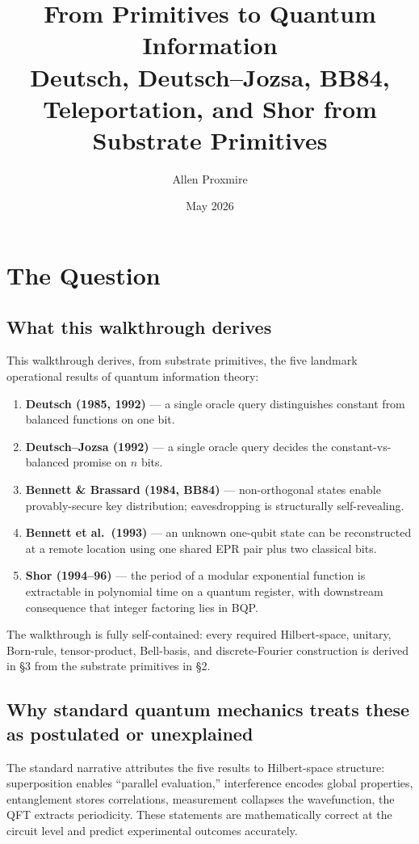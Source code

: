 \documentclass[11pt,a4paper]{article}
\title{\vspace{-1cm}\Large\bfseries From Primitives to Quantum Information\\[6pt]
\large\mdseries Deutsch, Deutsch--Jozsa, BB84, Teleportation, and Shor from Substrate Primitives}
\author{Allen Proxmire}
\date{May 2026}
\begin{document}
\maketitle
\thispagestyle{empty}

\section{The Question}

\subsection*{What this walkthrough derives}

This walkthrough derives, from substrate primitives, the five landmark operational results of quantum information theory:

\begin{enumerate}[noitemsep]
  \item \textbf{Deutsch (1985, 1992)} --- a single oracle query distinguishes constant from balanced functions on one bit.
  \item \textbf{Deutsch--Jozsa (1992)} --- a single oracle query decides the constant-vs-balanced promise on $n$ bits.
  \item \textbf{Bennett \& Brassard (1984, BB84)} --- non-orthogonal states enable provably-secure key distribution; eavesdropping is structurally self-revealing.
  \item \textbf{Bennett et al.\ (1993)} --- an unknown one-qubit state can be reconstructed at a remote location using one shared EPR pair plus two classical bits.
  \item \textbf{Shor (1994--96)} --- the period of a modular exponential function is extractable in polynomial time on a quantum register, with downstream consequence that integer factoring lies in BQP.
\end{enumerate}

The walkthrough is fully self-contained: every required Hilbert-space, unitary, Born-rule, tensor-product, Bell-basis, and discrete-Fourier construction is derived in \S3 from the substrate primitives in \S2.

\subsection*{Why standard quantum mechanics treats these as postulated or unexplained}

The standard narrative attributes the five results to Hilbert-space structure: superposition enables ``parallel evaluation,'' interference encodes global properties, entanglement stores correlations, measurement collapses the wavefunction, the QFT extracts periodicity. These statements are mathematically correct at the circuit level and predict experimental outcomes accurately.
\end{document}
